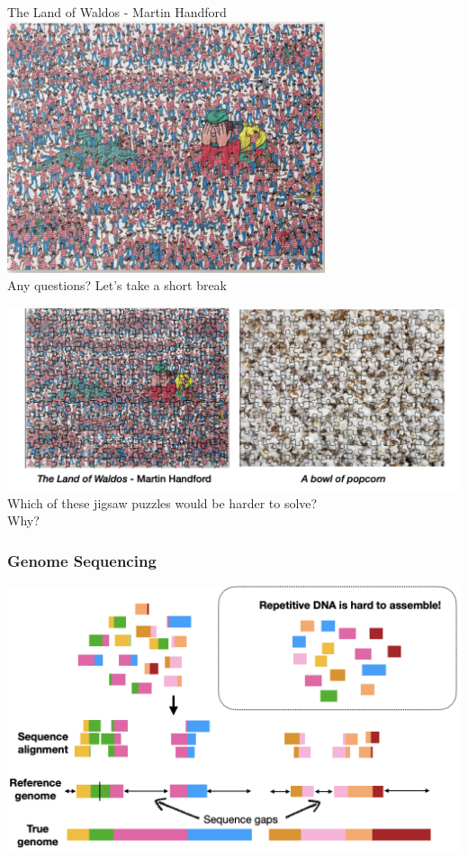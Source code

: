 \documentclass{beamer}
\begin{document}
\begin{frame}

	\Large{The Land of Waldos - Martin Handford}
\center		\includegraphics[width=0.7\textwidth]{img/Waldo}\\

	\Large Any questions? \pause Let's take a short break


\end{frame}


\begin{frame}
\center		\includegraphics[width=\textwidth]{img/wallyVpopcorn}\\
Which of these jigsaw puzzles would be harder to solve? \\\pause Why?
\end{frame}


\begin{frame}
	\frametitle{Genome Sequencing}
	
		\includegraphics[width=\textwidth]{img/repetitiveDNAreference}
\end{frame}
\end{document}

